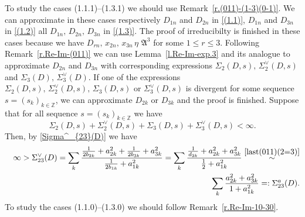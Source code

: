 \documentclass[preprint,12pt]{elsarticle}
\numberwithin{equation}{section}
\begin{document}
To study the cases (1.1.1)--(1.3.1) we should use Remark~\ref{r.(011)-(1-3)(0-1)}. 
 We can approximate in these cases respectively   $D_{1n}$ and $ D_{2n}$ in \eqref{(1.1)},  $D_{1n}$ and $D_{3n}$ in \eqref{(1.2)} all $D_{1n},\,D_{2n},\,D_{3n}$ in \eqref{(1.3)}. The proof of irreducibilty is finished in these cases
because we have  $D_{rn},\, x_{2n},\,x_{3n}\,\eta\,\, {\mathfrak A}^3$ for some $1\leq r\leq 3$.
Following  Remark~\ref{r.Re-Im-(011)} 
we can use 
Lemma~\ref{l.Re-Im-exp.3}
and its analogue 
to approximate $D_{2n}$ and  $D_{3n}$  with corresponding  expressions $\Sigma_2(D,s),\,\Sigma^{\vee}_2(D,s)$ and $\Sigma_3(D),\,\Sigma^{\vee}_3(D)$. 
If one of the expressions $\Sigma_2(D,s),\,\Sigma^{\vee}_2(D,s),\,\Sigma_3(D,s)$ or $\Sigma^{\vee}_3(D,s)$ is divergent for some sequence $s=(s_k)_{k\in \mathbb Z}$, we can approximate $D_{2k}$ or $D_{3k}$ and the proof is finished. Suppose that for all sequence $s=(s_k)_{k\in \mathbb Z}$ we have
\begin{equation*}
\Sigma_2(D,s)+\Sigma^{\vee}_2(D,s)+ \Sigma_3(D,s)+\Sigma^{\vee}_3(D,s)<\infty.
\end{equation*}
Then, by \eqref{Sigma^_{23}(D)} we have
\begin{eqnarray*}
 &&
\infty>\Sigma^{\vee}_{23}(D)=
\sum_k\frac{
\frac{1}{2b_{2k}}+a^2_{2k}+\frac{1}{2b_{3k}}+a^2_{3k}}{\frac{1}{2b_{1k}}+a^2_{1k}}
=
\sum_k\frac{
\frac{1}{d_{2k}}+a^2_{2k}+a^2_{3k}}{\frac{1}{2}+a^2_{1k}}
\stackrel{\eqref{last(011)(2=3)}}{\sim}\\
&&
\sum_k\frac{a^2_{2k}+a^2_{3k}}{1+a^2_{1k}}=:
\Sigma^{a}_{23}(D).
\end{eqnarray*}
To study the cases (1.1.0)--(1.3.0) we should follow Remark~\ref{r.Re-Im-10-30}.
\end{document}
